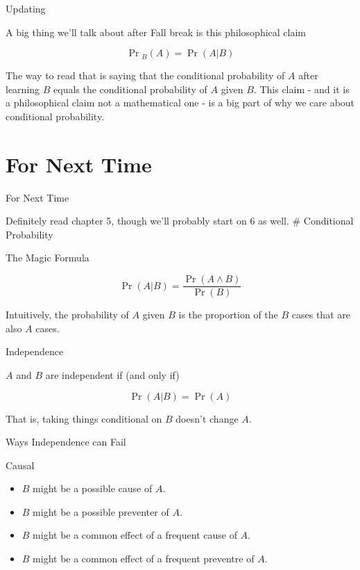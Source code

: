 \documentclass[
  ignorenonframetext,
]{beamer}
\providecommand{\tightlist}{%
  \setlength{\itemsep}{0pt}\setlength{\parskip}{0pt}}
\renewcommand{\,}{\text{, }}
\begin{document}
\begin{frame}{Updating}
\protect\hypertarget{updating}{}

A big thing we'll talk about after Fall break is this philosophical
claim

\[
\Pr{}_B(A) = \Pr(A | B)
\]

The way to read that is saying that the conditional probability of \(A\)
after learning \(B\) equals the conditional probability of \(A\) given
\(B\). This claim - and it is a philosophical claim not a mathematical
one - is a big part of why we care about conditional probability.

\end{frame}

\hypertarget{for-next-time-2}{%
\section{For Next Time}\label{for-next-time-2}}

\begin{frame}{For Next Time}
\protect\hypertarget{for-next-time-3}{}

Definitely read chapter 5, though we'll probably start on 6 as well. \#
Conditional Probability

\end{frame}

\begin{frame}{The Magic Formula}
\protect\hypertarget{the-magic-formula}{}

\[
\Pr(A | B) = \frac{\Pr(A \wedge B)}{\Pr(B)}
\]

Intuitively, the probability of \(A\) given \(B\) is the proportion of
the \(B\) cases that are also \(A\) cases.

\end{frame}

\begin{frame}{Independence}
\protect\hypertarget{independence}{}

\(A\) and \(B\) are independent if (and only if)

\[
\Pr(A | B) = \Pr(A)
\]

That is, taking things conditional on \(B\) doesn't change \(A\).

\end{frame}

\begin{frame}{Ways Independence can Fail}
\protect\hypertarget{ways-independence-can-fail}{}

Causal

\begin{itemize}
\tightlist
\item
  \(B\) might be a possible cause of \(A\). \pause
\item
  \(B\) might be a possible preventer of \(A\). \pause
\item
  \(B\) might be a common effect of a frequent cause of \(A\). \pause
\item
  \(B\) might be a common effect of a frequent preventre of \(A\).
\end{itemize}

\end{frame}
\end{document}
